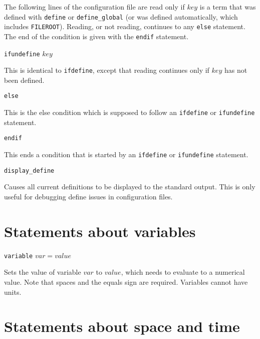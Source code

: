 \documentclass {scrbook}
\newcommand {\ttt} {\texttt}
\begin{document}
\begin{description}
The following lines of the configuration file are read only if $key$ is a term that was defined with \ttt{define} or \ttt{define\_global} (or was defined automatically, which includes \ttt{FILEROOT}). Reading, or not reading, continues to any \ttt{else} statement. The end of the condition is given with the \ttt{endif} statement.

\item{\ttt{ifundefine} $key$}

This is identical to \ttt{ifdefine}, except that reading continues only if $key$ has not been defined.

\item{\ttt{else}}

This is the else condition which is supposed to follow an \ttt{ifdefine} or \ttt{ifundefine} statement.

\item{\ttt{endif}}

This ends a condition that is started by an \ttt{ifdefine} or \ttt{ifundefine} statement.

\item{\ttt{display\_define}}

Causes all current definitions to be displayed to the standard output. This is only useful for debugging define issues in configuration files.

\end{description}

\section{Statements about variables}

\begin{description}

\item{\ttt{variable} $var = value$}

Sets the value of variable $var$ to $value$, which needs to evaluate to a numerical value. Note that spaces and the equals sign are required. Variables cannot have units.

\end{description}

\section{Statements about space and time}
\end{document}
